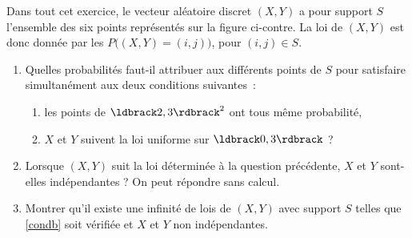 \documentclass[a4paper,12pt,reqno]{amsart}
\begin{document}
\begin{exo}

  \begin{minipage}{.77\linewidth}
  Dans tout cet exercice, le vecteur aléatoire discret $(X,Y)$ a pour support $S$ l'ensemble des six points représentés sur la figure ci-contre. La loi de $(X,Y)$ est donc donnée par les $P\big((X,Y)=(i,j)\big)$, pour $(i,j)\in S$.
  \end{minipage}%
  \begin{minipage}{.21\linewidth}
    \hfill
  \end{minipage}
    \begin{enumerate}
      \item Quelles probabilités faut-il attribuer aux différents points de $S$ pour satisfaire simultanément aux deux conditions suivantes~:
      \begin{enumerate}
        \item\label{conda} les points de $\iintv{2,3}^2$ ont tous même probabilité,
        \item\label{condb} $X$ et $Y$ suivent la loi uniforme sur $\iintv{0,3}$ ?
      \end{enumerate}
      \item Lorsque $(X,Y)$ suit la loi déterminée à la question précédente, $X$ et $Y$ sont-elles indépendantes ? On peut répondre sans calcul.
      \item Montrer qu'il existe une infinité de lois de $(X,Y)$ avec support $S$ telles que \ref{condb} soit vérifiée et $X$ et $Y$ non indépendantes.
    \end{enumerate}

\end{exo}
\end{document}
